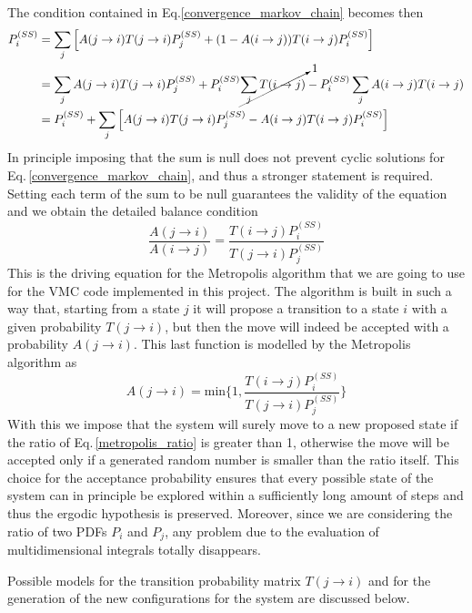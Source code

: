 The condition contained in Eq.\ref{convergence_markov_chain} becomes then
\begin{align*}
    P_i^{(SS)} &= \sum_j \left[ A(j\rightarrow i) T(j\rightarrow i) P_j^{(SS)} + (1 - A(i\rightarrow j)) T(i\rightarrow j) P_i^{(SS)} \right] \\
    &= \sum_j A(j\rightarrow i) T(j\rightarrow i) P_j^{(SS)} + P_i^{(SS)} \cancelto{1}{\sum_j T(i\rightarrow j)} - P_i^{(SS)} \sum_j A(i\rightarrow j) T(i\rightarrow j)  \\
    &= P_i^{(SS)} + \sum_j \left[ A(j\rightarrow i) T(j\rightarrow i) P_j^{(SS)} -  A(i\rightarrow j) T(i\rightarrow j) P_i^{(SS)}  \right]
\end{align*}
In principle imposing that the sum is null does not prevent cyclic solutions for Eq.\,\ref{convergence_markov_chain}, and thus a stronger statement is required. Setting each term of the sum to be null guarantees the validity of the equation and we obtain the detailed balance condition
\begin{equation}
    \frac{A(j\rightarrow i)}{A(i\rightarrow j)} =  \frac{ T(i\rightarrow j) P_i^{(SS)}}{T(j\rightarrow i) P_j^{(SS)}}
    \label{metropolis_ratio}
\end{equation}
This is the driving equation for the Metropolis algorithm that we are going to use for the VMC code implemented in this project. The algorithm is built in such a way that, starting from a state $j$ it will propose a transition to a state $i$ with a given probability $T(j\rightarrow i)$, but then the move will indeed be accepted with a probability $A(j\rightarrow i)$. This last function is modelled by the Metropolis algorithm as
\begin{equation*}
    A(j\rightarrow i ) = \text{min} \bigg\{ 1, \frac{T(i \rightarrow j) P_i^{(SS)}}{T(j\rightarrow i) P_j^{(SS)}} \bigg\}
\end{equation*}
With this we impose that the system will surely move to a new proposed state if the ratio of Eq.\,\ref{metropolis_ratio} is greater than 1, otherwise the move will be accepted only if a generated random number is smaller than the ratio itself. This choice for the acceptance probability ensures that every possible state of the system can in principle be explored within a sufficiently long amount of steps and thus the ergodic hypothesis is preserved. Moreover, since we are considering the ratio of two PDFs $P_i$ and $P_j$, any problem due to the evaluation of multidimensional integrals totally disappears. 

Possible models for the transition probability matrix $T(j\rightarrow i)$ and for the generation of the new configurations for the system are discussed below.



